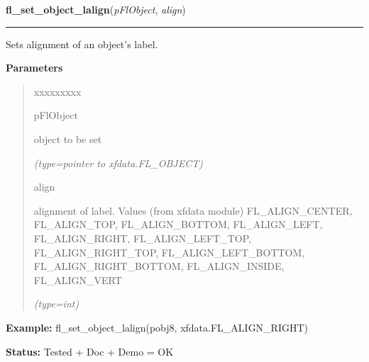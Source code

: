 \hspace{.8\funcindent}\begin{boxedminipage}{\funcwidth}

    \raggedright \textbf{fl\_set\_object\_lalign}(\textit{pFlObject}, \textit{align})

    \vspace{-1.5ex}

    \rule{\textwidth}{0.5\fboxrule}
\setlength{\parskip}{2ex}
    Sets alignment of an object's label.

\setlength{\parskip}{1ex}
      \textbf{Parameters}
      \vspace{-1ex}

      \begin{quote}
        \begin{Ventry}{xxxxxxxxx}

          \item[pFlObject]

          object to be set

            {\it (type=pointer to xfdata.FL\_OBJECT)}

          \item[align]

          alignment of label. Values (from xfdata module) 
          FL\_ALIGN\_CENTER, FL\_ALIGN\_TOP, FL\_ALIGN\_BOTTOM, 
          FL\_ALIGN\_LEFT, FL\_ALIGN\_RIGHT, FL\_ALIGN\_LEFT\_TOP, 
          FL\_ALIGN\_RIGHT\_TOP, FL\_ALIGN\_LEFT\_BOTTOM, 
          FL\_ALIGN\_RIGHT\_BOTTOM, FL\_ALIGN\_INSIDE, FL\_ALIGN\_VERT

            {\it (type=int)}

        \end{Ventry}

      \end{quote}

\textbf{Example:} fl\_set\_object\_lalign(pobj8, xfdata.FL\_ALIGN\_RIGHT)



\textbf{Status:} Tested + Doc + Demo = OK



    \end{boxedminipage}

    \label{xformslib:flbasic:fl_get_object_lalign}

    \vspace{0.5ex}

